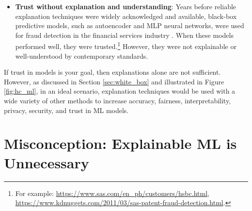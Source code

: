 \documentclass[fleqn]{article}
\begin{document}
\begin{itemize}
\begin{figure}
\begin{subfigure}{.5\textwidth}
  		\caption{$g_{\text{GBM}}$ deviance residuals and predictions by \texttt{PAY\_0}.}
  		\label{fig:resid}
	\end{subfigure}
	\caption{An unconstrained GBM probability of default model, $g_{\text{GBM}}$, over-emphasizes the importance of the input feature \texttt{PAY\_0}, a customer's most recent repayment status. $g_{\text{GBM}}$ produces large positive residuals when \texttt{PAY\_0} indicates on-time payments (\texttt{PAY\_0} $\leq$ 1) and large negative residuals when \texttt{PAY\_0} indicates late payments (\texttt{PAY\_0} $>$ 1).}
	\label{fig:global_shap_resid}
\end{figure}

\item \textbf{Trust without explanation and understanding}: Years before reliable explanation techniques were widely acknowledged and available, black-box predictive models, such as autoencoder and MLP neural networks, were used for fraud detection in the financial services industry \cite{gopinathan1998fraud}. When these models performed well, they were trusted.\footnote{For example: \url{https://www.sas.com/en_ph/customers/hsbc.html}, \url{https://www.kdnuggets.com/2011/03/sas-patent-fraud-detection.html}.} However, they were not explainable or well-understood by contemporary standards.  

\end{itemize}

If trust in models is your goal, then explanations alone are not sufficient. However, as discussed in Section \ref{sec:white_box} and illustrated in Figure \ref{fig:hc_ml}, in an ideal scenario, explanation techniques would be used with a wide variety of other methods to increase accuracy, fairness, interpretability, privacy, security, and trust in ML models. 

\section{Misconception: Explainable ML is Unnecessary}
\end{document}
